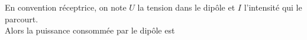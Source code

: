 \documentclass[a4paper]{article}
\begin{document}
\pagestyle{fancy}
\fancyhf{}
\setlength{\headheight}{15pt}

\begin{center}
	\large{}
\end{center}


En convention réceptrice, on note \(U\) la tension dans le dipôle et \(I\) l'intensité qui le parcourt.\\
Alors la puissance consommée par le dipôle est 
\end{document}
